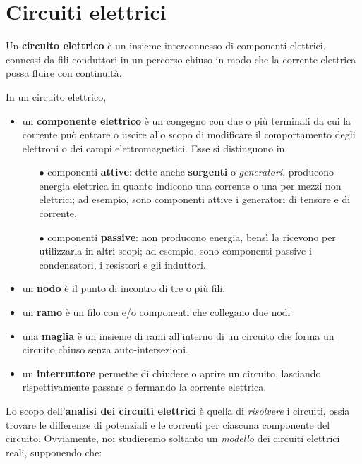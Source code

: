 \section{Circuiti elettrici}
\begin{define}
	Un \textbf{circuito elettrico} è un insieme interconnesso di componenti elettrici, connessi da fili conduttori in un percorso chiuso in modo che la corrente elettrica possa fluire con continuità.
\end{define}
\begin{define}
	In un circuito elettrico,
	\begin{itemize}
		\item un \textbf{componente elettrico} è un congegno con due o più terminali da cui la corrente può entrare o uscire allo scopo di modificare il comportamento degli elettroni o dei campi elettromagnetici. Esse si distinguono in
		\begin{enumerate}
			\item[$\bullet$] componenti \textbf{attive}: dette anche \textbf{sorgenti} o \textit{generatori}, producono energia elettrica in quanto indicono una corrente o una \ddp per mezzi non elettrici; ad esempio, sono componenti attive i generatori di tensore e di corrente.
			\item[$\bullet$] componenti \textbf{passive}: non producono energia, bensì la ricevono per utilizzarla in altri scopi; ad esempio, sono componenti passive  i condensatori, i resistori e gli induttori. 
		\end{enumerate}
		\item un \textbf{nodo} è il punto di incontro di tre o più fili.
		\item un \textbf{ramo} è un filo con e/o componenti che collegano due nodi 
		\item una \textbf{maglia} è un insieme di rami all'interno di un circuito che forma un circuito chiuso senza auto-intersezioni.
		\item un \textbf{interruttore} permette di chiudere o aprire un circuito, lasciando rispettivamente passare o fermando la corrente elettrica.
	\end{itemize}
\end{define}
Lo scopo dell'\textbf{analisi dei circuiti elettrici} è quella di \textit{risolvere} i circuiti, ossia trovare le differenze di potenziali e le correnti per ciascuna componente del circuito. Ovviamente, noi studieremo soltanto un \textit{modello} dei circuiti elettrici reali, supponendo che:
